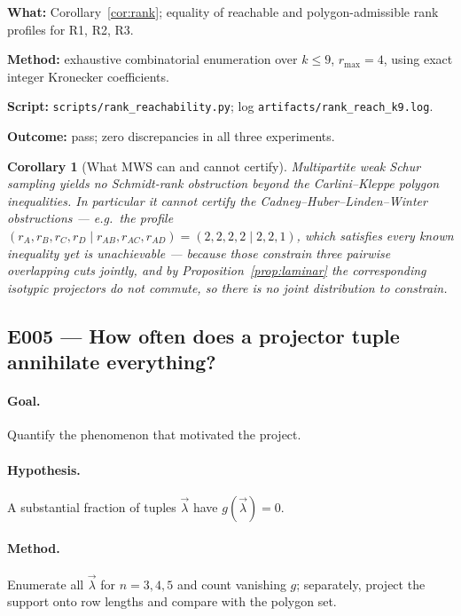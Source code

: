 \documentclass[11pt]{article}
\newtheorem{corollary}[theorem]{Corollary}
\theoremstyle{definition}
\theoremstyle{remark}
\newcommand{\bmlam}{\vec{\lambda}}
\begin{document}
\begin{verification}
\textbf{What:} Corollary~\ref{cor:rank}; equality of reachable and polygon-admissible
rank profiles for R1, R2, R3.

\textbf{Method:} exhaustive combinatorial enumeration over $k \le 9$,
$r_{\max} = 4$, using exact integer Kronecker coefficients.

\textbf{Script:} \texttt{scripts/rank\_reachability.py};
log \texttt{artifacts/rank\_reach\_k9.log}.

\textbf{Outcome:} pass; zero discrepancies in all three experiments.
\end{verification}

\begin{corollary}[What MWS can and cannot certify]
\label{cor:negative}
Multipartite weak Schur sampling yields no Schmidt-rank obstruction beyond the
Carlini--Kleppe polygon inequalities. In particular it cannot certify the
Cadney--Huber--Linden--Winter obstructions --- e.g.\ the profile
$(r_A,r_B,r_C,r_D \mid r_{AB},r_{AC},r_{AD}) = (2,2,2,2 \mid 2,2,1)$, which satisfies
every known inequality yet is unachievable \cite{CHLW2014} --- because those constrain
three \emph{pairwise overlapping} cuts jointly, and by Proposition~\ref{prop:laminar}
the corresponding isotypic projectors do not commute, so there is no joint distribution
to constrain.
\end{corollary}

\subsection{E005 --- How often does a projector tuple annihilate everything?}

\paragraph{Goal.} Quantify the phenomenon that motivated the project.

\paragraph{Hypothesis.} A substantial fraction of tuples $\bmlam$ have $g(\bmlam) = 0$.

\paragraph{Method.} Enumerate all $\bmlam$ for $n = 3,4,5$ and count vanishing
$g$; separately, project the support onto row lengths and compare with the polygon set.
\end{document}

